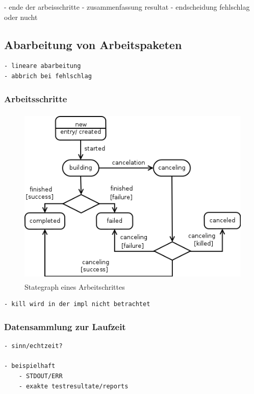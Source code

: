 - ende der arbeisschritte
- zusammenfassung resultat
- endscheidung fehlschlag oder nucht


\subsection{Abarbeitung von Arbeitspaketen}

\begin{verbatim}
- lineare abarbeitung
- abbrich bei fehlschlag
\end{verbatim}

\subsubsection{Arbeitsschritte}


\begin{figure}[ht] 
  \centering
  \label{fig:lebenszyklus-arbeitsschritt}
  \includegraphics[height=3.4in]{imageinput/lebenszyklus-arbeitsschritt.png}
  \caption{Stategraph eines Arbeitschrittes}
\end{figure}

\begin{verbatim}
- kill wird in der impl nicht betrachtet

\end{verbatim}


\subsubsection{Datensammlung zur Laufzeit}

\begin{verbatim}
- sinn/echtzeit?

- beispielhaft
    - STDOUT/ERR
    - exakte testresultate/reports
\end{verbatim}

